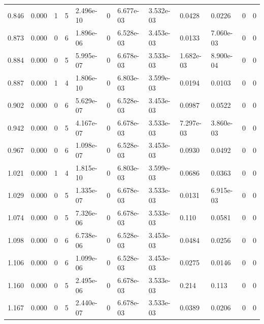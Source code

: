 \documentclass[preview]{standalone}
\begin{document}
{{\begin{tabular}{L{1.2cm}C{1.2cm} C{0.3cm}C{0.5cm} C{1.4cm}C{1.4cm} C{1.4cm}C{1.4cm} C{1.6cm}C{1.6cm} C{1.6cm}C{1.6cm}}
  0.846  &  0.000  & 1     &  5 &  2.496e-10  & 0  &  6.677e-03&   3.532e-03& 0.0428 & 0.0226   &  0 & 0  \\ 
  0.873  &  0.000  & 0     &  6 &  1.896e-06  & 0  &  6.528e-03&   3.453e-03& 0.0133 & 7.060e-03   &  0 & 0  \\ 
  0.884  &  0.000  & 0     &  5 &  5.995e-07  & 0  &  6.678e-03&   3.533e-03& 1.682e-03 & 8.900e-04   &  0 & 0  \\ 
  0.887  &  0.000  & 1     &  4 &  1.806e-10  & 0  &  6.803e-03&   3.599e-03& 0.0194 & 0.0103   &  0 & 0  \\ 
  0.902  &  0.000  & 0     &  6 &  5.629e-07  & 0  &  6.528e-03&   3.453e-03& 0.0987 & 0.0522   &  0 & 0  \\ 
  0.942  &  0.000  & 0     &  5 &  4.167e-07  & 0  &  6.678e-03&   3.533e-03& 7.297e-03 & 3.860e-03   &  0 & 0  \\ 
  0.967  &  0.000  & 0     &  6 &  1.098e-07  & 0  &  6.528e-03&   3.453e-03& 0.0930 & 0.0492   &  0 & 0  \\ 
  1.021  &  0.000  & 1     &  4 &  1.815e-10  & 0  &  6.803e-03&   3.599e-03& 0.0686 & 0.0363   &  0 & 0  \\ 
  1.029  &  0.000  & 0     &  5 &  1.335e-07  & 0  &  6.678e-03&   3.533e-03& 0.0131 & 6.915e-03   &  0 & 0  \\ 
  1.074  &  0.000  & 0     &  5 &  7.326e-06  & 0  &  6.678e-03&   3.533e-03& 0.110 & 0.0581   &  0 & 0  \\ 
  1.098  &  0.000  & 0     &  6 &  6.738e-06  & 0  &  6.528e-03&   3.453e-03& 0.0484 & 0.0256   &  0 & 0  \\ 
  1.106  &  0.000  & 0     &  6 &  1.099e-06  & 0  &  6.528e-03&   3.453e-03& 0.0275 & 0.0146   &  0 & 0  \\ 
  1.160  &  0.000  & 0     &  5 &  2.495e-06  & 0  &  6.678e-03&   3.533e-03& 0.214 & 0.113   &  0 & 0  \\ 
  1.167  &  0.000  & 0     &  5 &  2.440e-07  & 0  &  6.678e-03&   3.533e-03& 0.0389 & 0.0206   &  0 & 0  \\ 
\hline 
\end{tabular} 

}}
\end{document}
